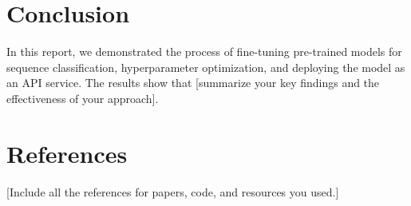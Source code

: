 \documentclass[a4paper,11pt]{article}
\begin{document}
\section{Conclusion}\label{sec:conclusion}
In this report, we demonstrated the process of fine-tuning pre-trained models for sequence classification, hyperparameter optimization, and deploying the model as an API service. The results show that [summarize your key findings and the effectiveness of your approach].

\section{References}\label{sec:references}
[Include all the references for papers, code, and resources you used.]
\end{document}
